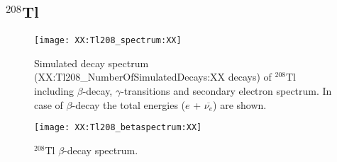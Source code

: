 \subsection{$^{208}$Tl}

\begin{figure}[h]
\centering
	\texttt{[image: XX:Tl208\_spectrum:XX]}
	\caption[$^{208}$Tl $\beta$-decay spectrum]{Simulated decay spectrum (XX:Tl208_NumberOfSimulatedDecays:XX decays) of $^{208}$Tl including $\beta$-decay, $\gamma$-transitions and secondary electron spectrum. In case of $\beta$-decay the total energies ($e$ + $\overline{\nu_{e}}$) are shown.}
	\label{fig:Tl208spectrum}
\end{figure}

\begin{figure}[h]
\centering
	\texttt{[image: XX:Tl208\_betaspectrum:XX]}
	\caption[$^{208}$Tl $\beta$-decay spectrum]{$^{208}$Tl $\beta$-decay spectrum.}
	\label{fig:Tl208betaspectrum}
\end{figure}

